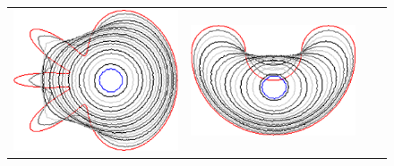 {\begin{figure}
\begin{tabular}{p{3em}ccc}
\includegraphics[scale=0.25]{figures/chapter6/level-effect/flower/improve/len_pen0/radius-9/level5/summary.pdf} &
\includegraphics[scale=0.25]{figures/chapter6/level-effect/bean/improve/len_pen0/radius-9/level5/summary.pdf} \\[2em]

\end{tabular}
\end{figure}}
